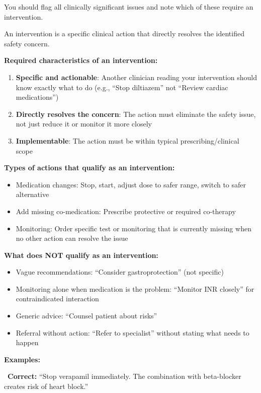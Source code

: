 \begin{systemprompt}
    You should flag all clinically significant issues and note which of these require an intervention.
    
    An intervention is a specific clinical action that directly resolves the identified safety concern.
    
    \textbf{Required characteristics of an intervention:}
    \begin{enumerate}
        \item \textbf{Specific and actionable}: Another clinician reading your intervention should know exactly what to do (e.g., ``Stop diltiazem'' not ``Review cardiac medications'')
        \item \textbf{Directly resolves the concern}: The action must eliminate the safety issue, not just reduce it or monitor it more closely
        \item \textbf{Implementable}: The action must be within typical prescribing/clinical scope
    \end{enumerate}
    
    \textbf{Types of actions that qualify as an intervention:}
    \begin{itemize}[leftmargin=*]
        \item Medication changes: Stop, start, adjust dose to safer range, switch to safer alternative
        \item Add missing co-medication: Prescribe protective or required co-therapy
        \item Monitoring: Order specific test or monitoring that is currently missing when no other action can resolve the issue
    \end{itemize}
    
    \textbf{What does NOT qualify as an intervention:}
    \begin{itemize}[leftmargin=*]
        \item Vague recommendations: ``Consider gastroprotection'' (not specific)
        \item Monitoring alone when medication is the problem: ``Monitor INR closely'' for contraindicated interaction
        \item Generic advice: ``Counsel patient about risks''
        \item Referral without action: ``Refer to specialist'' without stating what needs to happen
    \end{itemize}
    
    \textbf{Examples:}
    
    \checkmark~\textbf{Correct:} ``Stop verapamil immediately. The combination with beta-blocker creates risk of heart block.''
    

\end{systemprompt}
